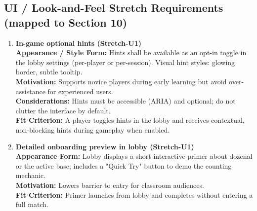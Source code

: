 \documentclass[12pt]{article}
\begin{document}
\subsection{UI / Look-and-Feel Stretch Requirements (mapped to Section 10)}
\begin{enumerate}
  \item \textbf{In-game optional hints (Stretch-U1)}\\
  \textbf{Appearance / Style Form:} Hints shall be available as an opt-in toggle in the lobby settings (per-player or per-session). Visual hint styles: glowing border, subtle tooltip.\\
  \textbf{Motivation:} Supports novice players during early learning but avoid over-assistance for experienced users.\\
  \textbf{Considerations:} Hints must be accessible (ARIA) and optional; do not clutter the interface by default.\\
  \textbf{Fit Criterion:} A player toggles hints in the lobby and receives contextual, non-blocking hints during gameplay when enabled.
  
  \item \textbf{Detailed onboarding preview in lobby (Stretch-U1)}\\
  \textbf{Appearance Form:} Lobby displays a short interactive primer about dozenal or the active base; includes a "Quick Try" button to demo the counting mechanic.\\
  \textbf{Motivation:} Lowers barrier to entry for classroom audiences.\\
  \textbf{Fit Criterion:} Primer launches from lobby and completes without entering a full match.
\end{enumerate}
\end{document}
